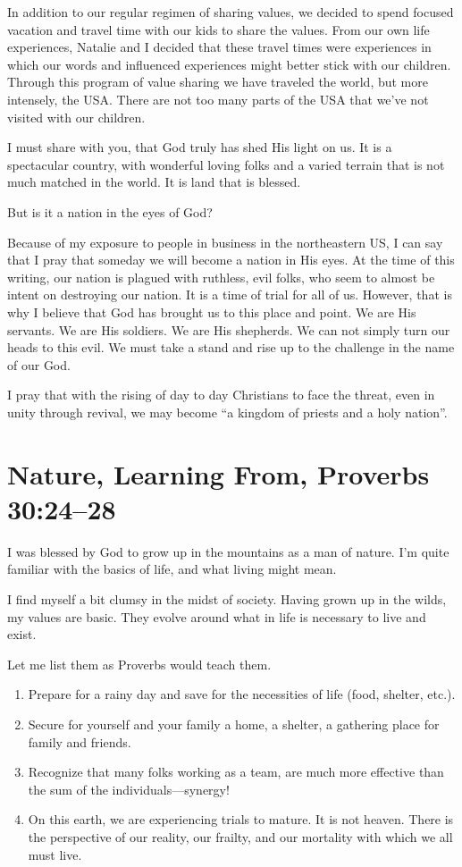 \documentclass[12pt]{memoir}
\begin{document}
In addition to our regular regimen of sharing values, we decided to spend focused vacation and travel
time with our kids to share the values. From our own life experiences,
Natalie and I decided that these travel times were experiences in
which our words and influenced experiences might better stick with our children. Through this program of value sharing we have traveled
the world, but more intensely, the USA. There are not too many parts
of the USA that we've not visited with our children.

I must share with you, that God truly has shed His light on us. It is a spectacular country, with wonderful loving folks and a varied terrain that is not much matched in the world. It is land that is blessed.

But is it a nation in the eyes of God?

Because of my exposure to people in business in the northeastern US, I can say that I pray that someday we will become a nation in His eyes. At the time of this writing, our nation is plagued with ruthless,
evil folks, who seem to almost be intent on destroying our nation.
It is a time of trial for all of us. However, that is why I believe
that God has brought us to this place and point. We are His servants.
We are His soldiers. We are His shepherds. We can not simply turn
our heads to this evil. We must take a stand and rise up to the challenge
in the name of our God. 

I pray that with the rising of day to day Christians to face the threat, even in unity through revival, we may become ``a
kingdom of priests and a holy nation''. 

\section[Nature, Learning From]{Nature, Learning From, Proverbs 30:24--28}
 

I was blessed by God to grow up in the mountains as a man of nature.
I'm quite familiar with the basics of life, and what living might mean.

I find myself a bit clumsy in the midst of society. Having grown up in the wilds, my values are basic. They evolve around what in life is necessary to live and exist.

Let me list them as Proverbs
would teach them.
\begin{enumerate}
\item Prepare for a rainy day and save for the necessities of life (food, shelter, etc.).

\item Secure for yourself and your family a home, a shelter, a gathering place for family and friends.

\item Recognize that many folks working as a team, are much more effective than the sum of the individuals---synergy!

\item On this earth, we are experiencing trials to mature. It is not heaven. There is the perspective of our reality, our frailty, and our mortality
with which we all must live.
\end{enumerate}
\end{document}
